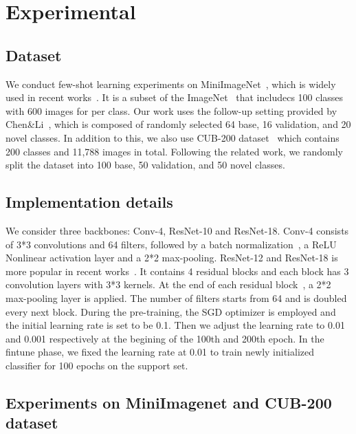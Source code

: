 \documentclass[runningheads]{llncs}
\begin{document}
\section{Experimental}
\subsection{Dataset}
We conduct few-shot learning experiments on MiniImageNet~\cite{vinyals2016matching}, which is widely used in recent works~\cite{mishra2017simple,qin2019rethink,finn2017model,vinyals2016matching,snell2017prototypical}. It is a subset of the ImageNet~\cite{russakovsky2015imagenet} that includecs 100 classes with 600 images for per class. Our work uses the follow-up setting provided by Chen\&Li~\cite{chen2019closer}, which is composed of randomly selected 64 base, 16 validation, and 20 novel classes. In addition to this, we also use CUB-200 dataset~\cite{wah2011caltech} which contains 200 classes and 11,788 images in total. Following the related work, we randomly split the dataset into 100 base, 50 validation, and 50 novel classes.
\subsection{Implementation details}
We consider three backbones: Conv-4, ResNet-10 and ResNet-18. Conv-4 consists of 3*3 convolutions and 64 filters, followed by a batch normalization~\cite{ioffe2015batch}, a ReLU Nonlinear activation layer and a 2*2 max-pooling. ResNet-12 and ResNet-18 is more popular in recent works~\cite{chen2019closer,cheny2019multi,sun2018meta}. It contains 4 residual blocks and each block has 3 convolution layers with 3*3 kernels. At the end of each residual block~\cite{he2016deep}, a 2*2 max-pooling layer is applied. The number of filters starts from 64 and is doubled every next block. During the pre-training, the SGD optimizer is employed and the initial learning rate is set to be 0.1. Then we adjust the learning rate to 0.01 and 0.001 respectively at the begining of the 100th and 200th epoch. In the fintune phase, we fixed the learning rate at 0.01 to train newly initialized classifier for 100 epochs on the support set.
\subsection{Experiments on MiniImagenet and CUB-200 dataset}
\end{document}
